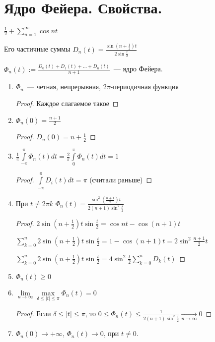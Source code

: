 \section{Ядро Фейера. Свойства.}

\begin{example}
    $\frac{1}{2} + \sum\limits_{n = 1}^\infty \cos nt$

    Его частичные суммы $D_n(t) = \frac{\sin(n + \frac{1}{2})t}{2\sin\frac{t}{2}}$

    $\Phi_n(t) := \frac{D_0(t) + D_1(t) + \ldots + D_n(t)}{n  + 1}$~--- ядро Фейера.

    \begin{properties}
        \leavevmode
        \begin{enumerate}
            \item $\Phi_n$~--- четная, непрерывная, $2\pi$-периодичная функция
                  \begin{proof}
                      Каждое слагаемое такое
                  \end{proof}
            \item $\Phi_n(0) = \frac{n + 1}{2}$
                  \begin{proof}
                      $D_n(0) = n + \frac{1}{2}$
                  \end{proof}
            \item $\frac{1}{\pi}\int\limits_{-\pi}^\pi \Phi_n(t)dt = \frac{2}{\pi}\int\limits_0^{\pi}\Phi_n(t)dt = 1$
                  \begin{proof}
                      $\int\limits_{-\pi}^{\pi}D_i(t)dt = \pi$ (считали раньше)
                  \end{proof}
            \item При $t \neq 2\pi k$ $\Phi_n(t) = \frac{\sin^2(\frac{n +1}{2}) t}{2(n+1)\sin^2\frac{t}{2}}$
                  \begin{proof}
                      $2\sin(n + \frac{1}{2})t \sin\frac{t}{2} = \cos nt - \cos (n+1)t$
                      
                      $\sum\limits_{k = 0}^n2\sin(n + \frac{1}{2})t\sin \frac{t}{2} = 1 - \cos(n+1)t = 2\sin^2\frac{n +1}{2}t$
                      
                      $\sum\limits_{k = 0}^n2\sin(n + \frac{1}{2})t\sin \frac{t}{2} = 4\sin^2\frac{t}{2} \sum\limits_{k = 0}^nD_k(t)$
                  \end{proof}
            \item $\Phi_n(t) \geq 0$
            \item $\lim\limits_{n \to \infty} \max\limits_{\delta \leq |t| \leq \pi} \Phi_n(t) = 0$
                  \begin{proof}
                      Если $\delta \leq |t| \leq \pi$, то $0 \leq \Phi_n(t) \leq \frac{1}{2(n + 1)\sin^2\frac{\delta}{2}} \xrightarrow[n \to \infty]{} 0$
                  \end{proof}
            \item $\Phi_n(0) \to +\infty$, $\Phi_n(t) \to 0$, при $t \neq 0$.
        \end{enumerate}
    \end{properties}
\end{example}

